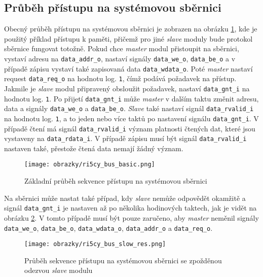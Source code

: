 \subsection{Průběh přístupu na systémovou sběrnici}		\label{subsec:sys_bus_access}
Obecný průběh přístupu na systémovou sběrnici je zobrazen na obrázku \ref{fig:ri5cy_bus_basic}, kde je použitý příklad přístupu k paměti, přičemž pro jiné \textit{slave} moduly bude protokol sběrnice fungovat totožně. Pokud chce \textit{master} modul přistoupit na sběrnici, vystaví adresu na \texttt{data\_addr\_o}, nastaví signály \texttt{data\_we\_o}, \texttt{data\_be\_o} a v případě zápisu vystaví také zapisovaná data \texttt{data\_wdata\_o}. Poté \textit{master} nastaví request \texttt{data\_req\_o} na hodnotu log. \texttt{1}, čímž podává požadavek na přístup. Jakmile je \textit{slave} modul připravený obsloužit požadavek, nastaví \texttt{data\_gnt\_i} na hodnotu log. \texttt{1}. Po přijetí \texttt{data\_gnt\_i} může \textit{master} v dalším taktu změnit adresu, data a signály \texttt{data\_we\_o} a \texttt{data\_be\_o}. \textit{Slave} také nastaví signál \texttt{data\_rvalid\_i} na hodnotu log. \texttt{1}, a to jeden nebo více taktů po nastavení signálu \texttt{data\_gnt\_i}. V případě čtení má signál \texttt{data\_rvalid\_i} význam platnosti čtených dat, které jsou vystaveny na \texttt{data\_rdata\_i}. V případě zápisu musí být signál \texttt{data\_rvalid\_i} nastaven také, přestože čtená data nemají žádný význam. \cite{ri5cy}
 
\begin{figure}[t]
  \begin{center}
    \texttt{[image: obrazky/ri5cy\_bus\_basic.png]}
  \end{center}
  \caption{Základní průběh sekvence přístupu na systémovou sběrnici \cite{ri5cy}}
	\label{fig:ri5cy_bus_basic}
\end{figure}

Na sběrnici může nastat také případ, kdy \textit{slave} nemůže odpovědět okamžitě a signál \texttt{data\_gnt\_i} je nastaven až po několika hodinových taktech, jak je vidět na obrázku \ref{fig:ri5cy_bus_slow_res}. V tomto případě musí být pouze zaručeno, aby \textit{master} neměnil signály \texttt{data\_we\_o}, \texttt{data\_be\_o}, \texttt{data\_wdata\_o}, \texttt{data\_addr\_o} a \texttt{data\_req\_o}. 

\begin{figure}[H]
  \begin{center}
    \texttt{[image: obrazky/ri5cy\_bus\_slow\_res.png]}
  \end{center}
  \caption{Průběh sekvence přístupu na systémovou sběrnici se zpožděnou odezvou \textit{slave} modulu \cite{ri5cy}}
	\label{fig:ri5cy_bus_slow_res}
\end{figure}


